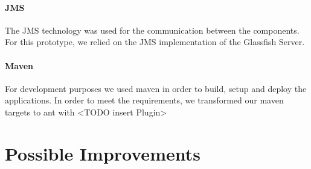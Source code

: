 \documentclass[a4paper]{article}
\begin{document}
\paragraph{JMS}
The JMS technology was used for the communication between the components. For this prototype, we relied on the JMS implementation of the Glassfish Server.

\paragraph{Maven}
For development purposes we used maven in order to build, setup and deploy the applications. In order to meet the requirements, we transformed our maven targets to ant with <TODO insert Plugin>






 






\section{Possible Improvements}
\end{document}
